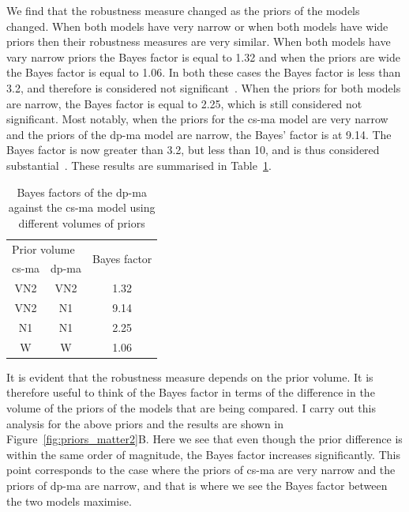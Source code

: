 We find that the robustness measure changed as the priors of the models changed. When both models have very narrow or when both models have wide priors then their robustness measures are very similar. When both models have vary narrow priors the Bayes factor is equal to 1.32 and when the priors are wide the Bayes factor is equal to 1.06. In both these cases the Bayes factor is less than 3.2, and therefore is considered not significant~\autocite{Kass:1995eh}. When the priors for both models are narrow, the Bayes factor is equal to 2.25, which is still considered not significant. Most notably, when the priors for the \acrshort{cs-ma} model are very narrow and the priors of the \acrshort{dp-ma} model are narrow, the Bayes' factor is at 9.14. The Bayes factor is now greater than 3.2, but less than 10, and is thus considered substantial~\autocite{Kass:1995eh}.  These results are summarised in Table~\ref{tab:bayes_vols}.

\begin{table}[tb]
\centering
\caption{Bayes factors of the \acrshort{dp-ma} against the \acrshort{cs-ma}  model using different volumes of priors}
\label{tab:bayes_vols}
\begin{tabular}{@{}ccc@{}}
\toprule
\multicolumn{2}{l}{Prior volume} & \multirow{2}{*}{Bayes factor} \\ \cmidrule(r){1-2}
\acrshort{cs-ma}  & \acrshort{dp-ma} &  \\ \midrule
VN2 & VN2 & 1.32 \\
VN2 & N1 & 9.14 \\
N1 & N1 & 2.25 \\
W & W & 1.06 \\ \bottomrule
\end{tabular}
\end{table}

It is evident that the robustness measure depends on the prior volume. It is therefore useful to think of the Bayes factor in terms of the difference in the volume of the priors of the models that are being compared. I carry out this analysis for the above priors and the results are shown in Figure~\ref{fig:priors_matter2}B. Here we see that even though the prior difference is within the same order of magnitude, the Bayes factor increases significantly. This point corresponds to the case where the priors of \acrshort{cs-ma} are very narrow and the priors of \acrshort{dp-ma} are narrow, and that is where we see the Bayes factor between the two models maximise. %

